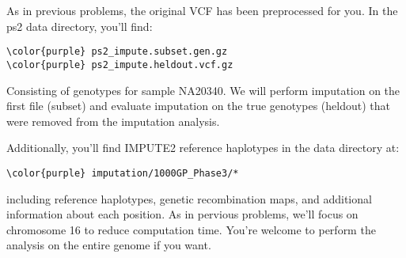 \documentclass[12pt]{article}
\begin{document}
As in previous problems, the original VCF has been preprocessed for you. In the ps2 data directory, you'll find:

\begin{Verbatim}[commandchars=\\\{\}]
\color{purple} ps2_impute.subset.gen.gz 
\color{purple} ps2_impute.heldout.vcf.gz 
\end{Verbatim}

Consisting of genotypes for sample NA20340. We will perform imputation on the first file (subset) and evaluate imputation on the true genotypes (heldout) that were removed from the imputation analysis.

Additionally, you'll find IMPUTE2 reference haplotypes in the data directory at:
\begin{Verbatim}[commandchars=\\\{\}]
\color{purple} imputation/1000GP_Phase3/*
\end{Verbatim}
including reference haplotypes, genetic recombination maps, and additional information about each position. As in pervious problems, we'll focus on chromosome 16 to reduce computation time. You're welcome to perform the analysis on the entire genome if you want.
\end{document}
